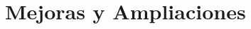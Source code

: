 \documentclass[a4paper,12pt,twoside,openright]{report}
\begin{document}
    \chapter{Mejoras y Ampliaciones}
    
    
    
    
    
    \printbibliography[heading=bibintoc]
    
\end{document}
